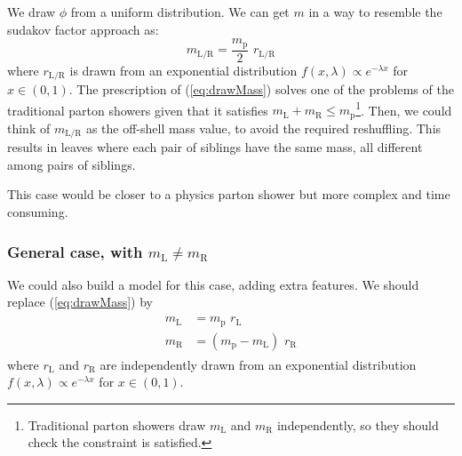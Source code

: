 \documentclass[12pt]{article}
\def\beq{\begin{equation}}
\def\eeq{\end{equation}}
\def\beq{\begin{equation}}
\def\eeq{\end{equation}}
\newcommand{\bea}{\begin{eqnarray}\begin{aligned}}
\newcommand{\eea}{\end{aligned}\end{eqnarray}}
\begin{document}
We draw $\phi$ from a uniform distribution. We can get $m$ in a way to resemble the sudakov factor approach as:
\beq\label{eq:drawMass}
m_{\text{L/R}} = \frac{m_{\text{p}}}{2}\,\,  r_{\text{L/R}} 
\eeq
where $r_{\text{L/R}}$ is drawn from an exponential distribution $f(x,\lambda) \propto e^{-\lambda x}$ for $x \in (0,1)$. The prescription of (\ref{eq:drawMass}) solves one of the problems of the traditional parton showers given that it satisfies $m_{\text{L}} + m_{\text{R}} \leq m_{\text{p}}$\footnote{Traditional parton showers draw $m_{\text{L}}$ and $m_{\text{R}}$ independently, so they should check the constraint is satisfied.}. Then, we could think of $m_{\text{L/R}}$ as the off-shell mass value, to avoid the required reshuffling. This results in leaves where each pair of siblings have the same mass, all different among pairs of siblings.


This case would be closer to a physics parton shower but more complex and time consuming.

\subsubsection{General case, with  $m_{\text{L}}\neq m_{\text{R}}$}

We could also build a model for this case, adding extra features. 
We should replace (\ref{eq:drawMass}) by
\bea
m_{\text{L}} &= m_{\text{p}}\,\,  r_{\text{L}}  \\
m_{\text{R}} &= (m_{\text{p}}-m_{\text{L}})\,\,  r_{\text{R}}
\eea
where $r_{\text{L}}$ and $r_{\text{R}}$ are independently drawn from an exponential distribution $f(x,\lambda) \propto e^{-\lambda x}$ for $x \in (0,1)$.
\end{document}
